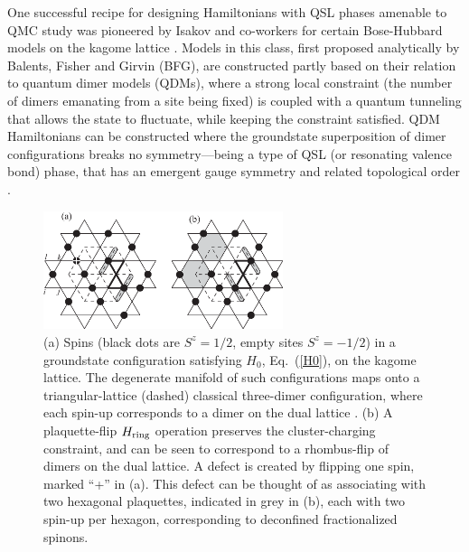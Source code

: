 \documentclass[10pt,pre,aps,twocolumn,showpacs,subscriptaddresses,floatfix]{revtex4}
\begin{document}
One successful recipe for designing Hamiltonians with QSL phases amenable to QMC study was pioneered by Isakov and co-workers for certain Bose-Hubbard models on the kagome 
lattice \cite{Isakov1, Isakov2, TopoEE}.  Models in this class, first proposed analytically by Balents, Fisher and Girvin \cite{BFG} (BFG), are constructed partly based on their 
relation to quantum dimer models (QDMs), where a strong local constraint (the number of dimers emanating from a site being fixed) is coupled with a quantum tunneling that allows 
the state to fluctuate, while keeping the constraint satisfied. QDM Hamiltonians can be constructed where the groundstate superposition of dimer configurations breaks no 
symmetry---being a type of QSL (or resonating valence bond) phase, that has an emergent gauge symmetry and related topological order \cite{Misguich1}.

\begin{figure}
\includegraphics[width=7cm, clip]{fig09.eps}
\caption{ (a) Spins (black dots are $S^z = 1/2$, empty sites $S^z = -1/2$) in a groundstate configuration satisfying $H_0$, Eq.~(\ref{H0}), on the kagome lattice.  
The degenerate manifold of such configurations maps onto a triangular-lattice (dashed) classical three-dimer configuration, where each spin-up corresponds to a dimer 
on the dual lattice \cite{BFG}. (b) A plaquette-flip $H_{\rm ring}$ operation preserves the cluster-charging constraint, and can be seen to correspond 
to a rhombus-flip of dimers on the dual lattice.  A defect is created by flipping one spin, marked ``+'' in (a).  This defect can be thought of as associating with 
two hexagonal plaquettes, indicated in grey in (b), each with two spin-up per hexagon, corresponding to deconfined fractionalized spinons.} \label{kag_fig}
\end{figure}
\end{document}
